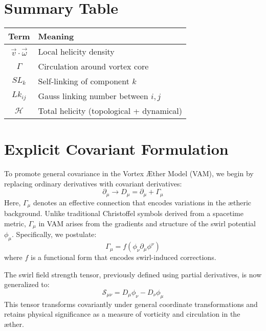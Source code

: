\section*{Summary Table}
\begin{tabular}{|c|l|}
    \hline
    \textbf{Term} & \textbf{Meaning} \\
    \hline
    $\vec{v} \cdot \vec{\omega}$ & Local helicity density \\
    $\Gamma$ & Circulation around vortex core \\
    $SL_k$ & Self-linking of component $k$ \\
    $Lk_{ij}$ & Gauss linking number between $i,j$ \\
    $\mathcal{H}$ & Total helicity (topological + dynamical) \\
    \hline
\end{tabular}



\section{Explicit Covariant Formulation}\label{sec:explicit-covariant-formulation}
        To promote general covariance in the Vortex Æther Model (VAM), we begin by replacing ordinary derivatives with covariant derivatives:
        \begin{equation}
            \partial_\mu \rightarrow D_\mu = \partial_\mu + \Gamma_\mu
        \end{equation}
        Here, $\Gamma_\mu$ denotes an effective connection that encodes variations in the ætheric background. Unlike traditional Christoffel symbols derived from a spacetime metric, $\Gamma_\mu$ in VAM arises from the gradients and structure of the swirl potential $\phi_\mu$. Specifically, we postulate:
        \begin{equation}
            \Gamma_\mu = f(\phi_\nu \partial_\mu \phi^\nu)
        \end{equation}
        where $f$ is a functional form that encodes swirl-induced corrections.

        The swirl field strength tensor, previously defined using partial derivatives, is now generalized to:
        \begin{equation}
            \mathcal{S}_{\mu\nu} = D_\mu \phi_\nu - D_\nu \phi_\mu
        \end{equation}
        This tensor transforms covariantly under general coordinate transformations and retains physical significance as a measure of vorticity and circulation in the æther.

